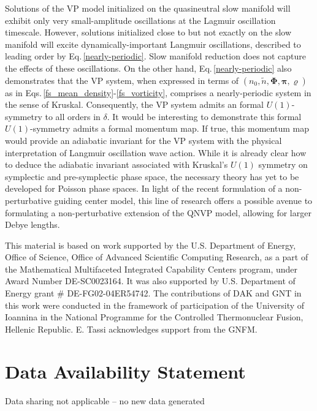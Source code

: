 \documentclass[%
 aip,
 amsmath,amssymb,
reprint, onecolumn %
]{revtex4-1}
\begin{document}
Solutions of the VP model initialized on the quasineutral slow manifold will exhibit only very small-amplitude oscillations at the Lagmuir oscillation timescale. However, solutions initialized close to but not exactly on the slow manifold will excite dynamically-important Langmuir oscillations, described to leading order by Eq.\,\eqref{nearly-periodic}. Slow manifold reduction does not capture the effects of these oscillations. On the other hand, Eq.\,\eqref{nearly-periodic} also demonstrates that the VP system, when expressed in terms of $(n_0,\widetilde{n},\bm{\Phi},\bm{\pi},\varrho)$ as in Eqs.\,\eqref{fs_mean_density}-\eqref{fs_vorticity}, comprises a nearly-periodic system in the sense of Kruskal\cite{kruskal_asymptotic_1962,burby_general_2020,burby_normal_2021,burby_nearly_2023}. Consequently, the VP system admits an formal $U(1)$-symmetry to all orders in $\delta$. It would be interesting to demonstrate this formal $U(1)$-symmetry admits a formal momentum map. If true, this momentum map would provide an adiabatic invariant for the VP system with the physical interpretation of Langmuir oscillation wave action\cite{brizard_wave-action_1993}. While it is already clear how to deduce the adiabatic invariant associated with Kruskal's $U(1)$ symmetry on symplectic and pre-symplectic phase space\cite{burby_general_2020}, the necessary theory has yet to be developed for Poisson phase spaces. In light of the recent formulation of a non-perturbative guiding center model\cite{j_w_burby_nonperturbative_2025}, this line of research offers a possible avenue to formulating a non-perturbative extension of the QNVP model, allowing for larger Debye lengths.


\begin{acknowledgments}
This material is based on work supported by the U.S. Department of Energy, Office of Science, Office of Advanced Scientific Computing Research, as a part of the Mathematical Multifaceted Integrated Capability Centers program, under Award Number DE-SC0023164. It was also supported by U.S. Department of Energy grant \# DE-FG02-04ER54742. The contributions of DAK and GNT in this work were conducted in the framework of participation of the University of Ioannina in the National Programme for the Controlled Thermonuclear Fusion, Hellenic Republic. E. Tassi acknowledges support from the GNFM.
\end{acknowledgments}

\section*{Data Availability Statement}
Data sharing not applicable – no new data generated
\end{document}
